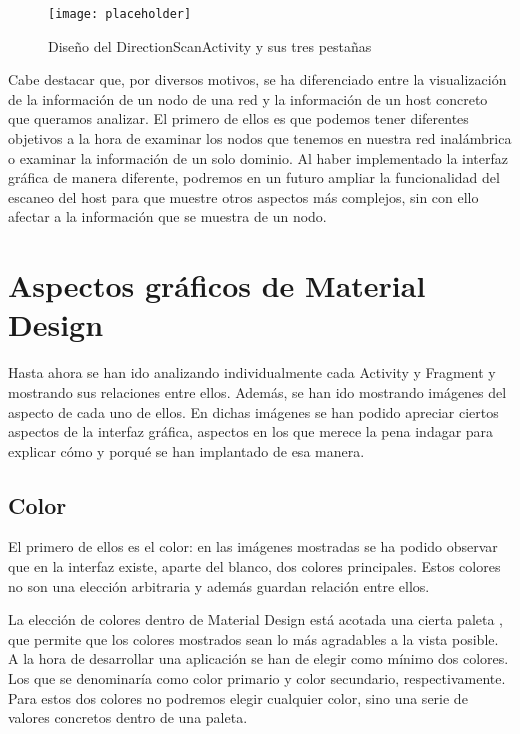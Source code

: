 \begin{figure}[H] %
	\centering
	\texttt{[image: placeholder]}
	\caption{Diseño del DirectionScanActivity y sus tres pestañas}
	\label{fig:directionScanActivity}
\end{figure}

Cabe destacar que, por diversos motivos, se ha diferenciado entre la visualización de la información de un nodo de una red y la información de un host concreto que queramos analizar. El primero de ellos es que podemos tener diferentes objetivos a la hora de examinar los nodos que tenemos en nuestra red inalámbrica o examinar la información de un solo dominio. Al haber implementado la interfaz gráfica de manera diferente, podremos en un futuro ampliar la funcionalidad del escaneo del host para que muestre otros aspectos más complejos, sin con ello afectar a la información que se muestra de un nodo.

\section{Aspectos gráficos de Material Design}

Hasta ahora se han ido analizando individualmente cada Activity y Fragment y mostrando sus relaciones entre ellos. Además, se han ido mostrando imágenes del aspecto de cada uno de ellos. En dichas imágenes se han podido apreciar ciertos aspectos de la interfaz gráfica, aspectos en los que merece la pena indagar para explicar cómo y porqué se han implantado de esa manera.

\subsection{Color}

El primero de ellos es el color: en las imágenes mostradas se ha podido observar que en la interfaz existe, aparte del blanco, dos colores principales. Estos colores no son una elección arbitraria y además guardan relación entre ellos.

La elección de colores dentro de Material Design está acotada una cierta paleta \cite{mat-des-color}, que permite que los colores mostrados sean lo más agradables a la vista posible. A la hora de desarrollar una aplicación se han de elegir como mínimo dos colores. Los que se denominaría como color primario y color secundario, respectivamente. Para estos dos colores no podremos elegir cualquier color, sino una serie de valores concretos dentro de una paleta.

